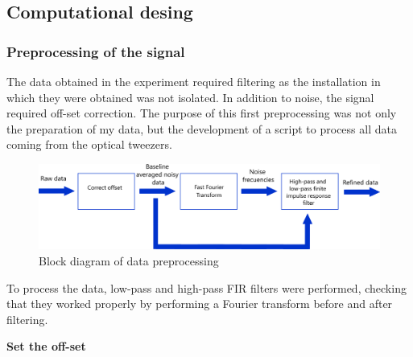\documentclass[12pt, a4paper]{article} %
\begin{document}
\setlength{\parindent}{8pt}

\setlength{\parskip}{0mm}

\subsection{Computational desing}

\subsubsection{Preprocessing of the signal}

The data obtained in the experiment required filtering as the installation in which they were obtained was not isolated. In addition to noise, the signal required off-set correction. The purpose of this first preprocessing was not only the preparation of my data, but the development of a script to process all data coming from the optical tweezers. 

\setlength{\parskip}{4mm}

\begin{figure}[htbp]
	\centering
	\includegraphics[width=1\textwidth]{figures/esquema_preprocesado_metodos_1.png}
	\caption{Block diagram of data preprocessing}
	\label{fig:esquema_preprocesado}
\end{figure}

To process the data, low-pass and high-pass FIR filters were performed, checking that they worked properly by performing a Fourier transform before and after filtering. 

\setlength{\parskip}{8mm}
\setlength{\parindent}{0pt}

\newpage

\textbf{Set the off-set}
\setlength{\parskip}{0mm}
\end{document}
